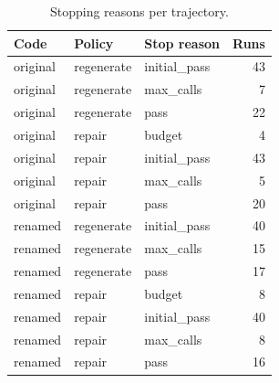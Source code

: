 \begin{table}[t]
\centering\small
\caption{Stopping reasons per trajectory.}
\label{tab:stops}
\begin{tabular}{lllr}
\toprule
Code & Policy & Stop reason & Runs \\
\midrule
original & regenerate & initial\_pass & 43 \\
original & regenerate & max\_calls & 7 \\
original & regenerate & pass & 22 \\
original & repair & budget & 4 \\
original & repair & initial\_pass & 43 \\
original & repair & max\_calls & 5 \\
original & repair & pass & 20 \\
renamed & regenerate & initial\_pass & 40 \\
renamed & regenerate & max\_calls & 15 \\
renamed & regenerate & pass & 17 \\
renamed & repair & budget & 8 \\
renamed & repair & initial\_pass & 40 \\
renamed & repair & max\_calls & 8 \\
renamed & repair & pass & 16 \\
\bottomrule
\end{tabular}
\end{table}

